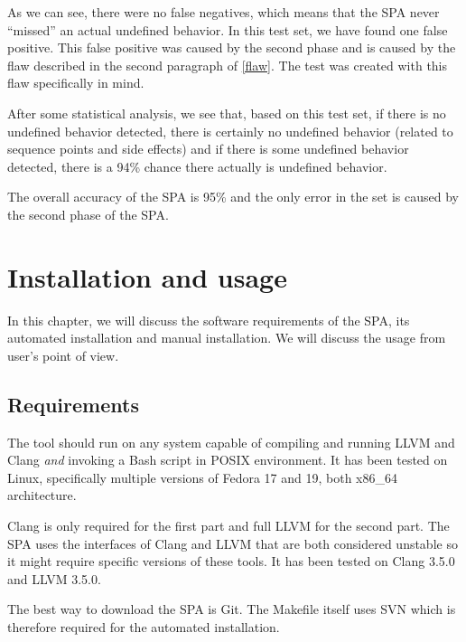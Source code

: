 As we can see, there were no false negatives, which means that the SPA never ``missed'' an actual undefined behavior. In this test set, we have found one false positive. This false positive was caused by the second phase and is caused by the flaw described in the second paragraph of \ref{flaw}. The test was created with this flaw specifically in mind.

After some statistical analysis, we see that, based on this test set, if there is no undefined behavior detected, there is certainly no undefined behavior (related to sequence points and side effects) and if there is some undefined behavior detected, there is a 94\% chance there actually is undefined behavior.

The overall accuracy of the SPA is 95\% and the only error in the set is caused by the second phase of the SPA.

\chapter{Installation and usage}
In this chapter, we will discuss the software requirements of the SPA, its automated installation and manual installation. We will discuss the usage from user's point of view.%
\section{Requirements}
The tool should run on any system capable of compiling and running LLVM and Clang \emph{and} invoking a Bash script in POSIX environment. It has been tested on Linux, specifically multiple versions of Fedora 17 and 19, both x86\_64 architecture.

Clang is only required for the first part and full LLVM for the second part. The SPA uses the interfaces of Clang and LLVM that are both considered unstable so it might require specific versions of these tools. It has been tested on Clang 3.5.0  and LLVM 3.5.0.

The best way to download the SPA is Git. The Makefile itself uses SVN which is therefore required for the automated installation.
